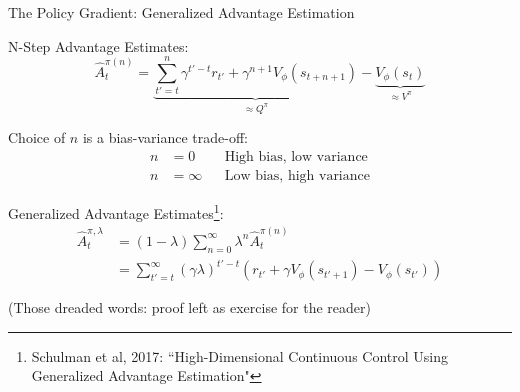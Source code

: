\documentclass[9pt]{beamer}
\begin{document}
\begin{frame}{The Policy Gradient: Generalized Advantage Estimation}

N-Step Advantage Estimates:
%
\begin{equation*}
\hat{A}_t^{\pi(n)} = \underbrace{\sum_{t'=t}^n \gamma^{t'-t} r_{t'} + \gamma^{n+1} V_{\phi}(s_{t+n+1})}_{\approx Q^{\pi}} - \underbrace{V_{\phi}(s_t)}_{\approx V^{\pi}}
\end{equation*}

Choice of $n$ is a bias-variance trade-off:
%
\begin{align*}
n&=0 && \text{High bias, low variance} \\
n&=\infty && \text{Low bias, high variance}
\end{align*}

Generalized Advantage Estimates\footnote{Schulman et al, 2017: ``High-Dimensional Continuous Control Using Generalized Advantage Estimation"}:
%
\begin{align*}
\hat{A}^{\pi, \lambda}_t &= (1 - \lambda) \sum_{n=0}^{\infty} \lambda^n \hat{A}_t^{\pi(n)}  \\
&= \sum_{t'=t}^{\infty} (\gamma \lambda)^{t'-t} \left(r_{t'} + \gamma V_{\phi}(s_{t'+1}) - V_{\phi}(s_{t'})\right)
\end{align*}

(Those dreaded words: proof left as exercise for the reader)
\end{frame}
\end{document}
